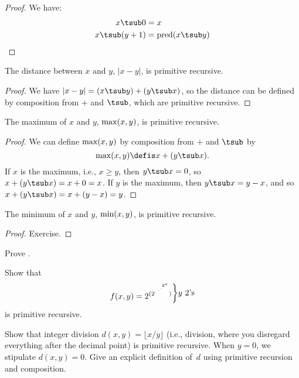 \documentclass[../../../include/open-logic-section]{subfiles}
\begin{document}
\begin{proof}
  We have:
  \begin{align*}
    x \tsub 0 & = x\\
    x \tsub (y+1) & = \fn{pred}(x \tsub y) 
  \end{align*}
\end{proof}

\begin{prop}
 The distance between $x$ and $y$, $\left|x-y\right|$, is primitive recursive.
\end{prop}

\begin{proof}
  We have $\left| x-y \right| = (x \tsub y) + (y \tsub x)$, so
  the distance can be defined by composition from $+$ and $\tsub$,
  which are primitive recursive.
\end{proof}

\begin{prop}
  The maximum of $x$ and $y$, $\mathrm{max}(x,y)$, is primitive recursive.
\end{prop}

\begin{proof}
  We can define $\mathrm{max}(x,y)$ by composition from $+$ and $\tsub$ by
  \[
  \fn{max}(x,y) \defis x + (y \tsub x).
  \]
  If $x$ is the maximum, i.e., $x \ge y$, then $y \tsub x = 0$, so $x
  + (y \tsub x) = x + 0 = x$. If $y$ is the maximum, then $y \tsub x =
  y - x$, and so $x + (y \tsub x) = x + (y - x) = y$.
\end{proof}

\begin{prop}
  The minimum of $x$ and $y$, $\mathrm{min}(x,y)$, is primitive recursive.
\end{prop}

\begin{proof}
  Exercise.
\end{proof}

\begin{prob}
  Prove .
\end{prob}

\begin{prob}
Show that \[
f(x, y) =
2^{(2^{\iddots^{2^{x}}})}\raisebox{1ex}{\bigg\rbrace}
\raisebox{1ex}{\text {$y$ $2$'s}}\] is primitive recursive.
\end{prob}

\begin{prob}
Show that integer division $d(x, y) = \lfloor x/y \rfloor$ (i.e.,
division, where you disregard everything after the decimal point) is
primitive recursive. When $y = 0$, we stipulate $d(x, y) = 0$. Give an
explicit definition of~$d$ using primitive recursion and
composition.
\end{prob}
\end{document}
